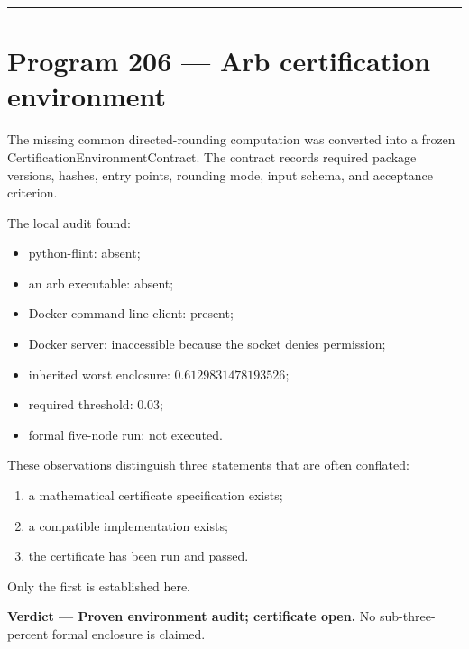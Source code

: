 \documentclass[11pt,a4paper,openany]{report}
\begin{document}
\par\medskip\hrule\medskip

\chapter{Program 206 --- Arb certification environment}

The missing common directed-rounding computation was converted into a frozen CertificationEnvironmentContract. The contract records required package versions, hashes, entry points, rounding mode, input schema, and acceptance criterion.

The local audit found:

\begin{itemize}
\item 
python-flint: absent;

\item 
an arb executable: absent;

\item 
Docker command-line client: present;

\item 
Docker server: inaccessible because the socket denies permission;

\item 
inherited worst enclosure: \(0.6129831478193526\);

\item 
required threshold: \(0.03\);

\item 
formal five-node run: not executed.

\end{itemize}

These observations distinguish three statements that are often conflated:

\begin{enumerate}
\item 
a mathematical certificate specification exists;

\item 
a compatible implementation exists;

\item 
the certificate has been run and passed.

\end{enumerate}

Only the first is established here.

\textbf{Verdict --- Proven environment audit; certificate open.} No sub-three-percent formal enclosure is claimed.
\end{document}
